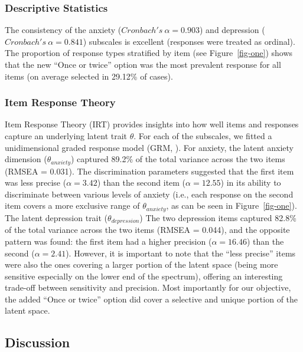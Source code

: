 \documentclass[
  jou,
  longtable,
  nolmodern,
  notxfonts,
  notimes,
  mask,
  colorlinks=true,linkcolor=blue,citecolor=blue,urlcolor=blue]{apa7}
\begin{document}
\subsubsection{Descriptive Statistics}\label{descriptive-statistics}

The consistency of the anxiety (\(Cronbach's~\alpha = 0.903\)) and
depression (\(Cronbach's~\alpha = 0.841\)) subscales is excellent
(responses were treated as ordinal). The proportion of response types
stratified by item (see Figure~\ref{fig-one}) shows that the new ``Once
or twice'' option was the most prevalent response for all items (on
average selected in 29.12\% of cases).

\subsubsection{Item Response Theory}\label{item-response-theory}

Item Response Theory (IRT) provides insights into how well items and
responses capture an underlying latent trait \(\theta\). For each of the
subscales, we fitted a unidimensional graded response model (GRM,
). For anxiety, the
latent anxiety dimension (\(\theta_{anxiety}\)) captured 89.2\% of the
total variance across the two items (RMSEA = 0.031). The discrimination
parameters suggested that the first item was less precise
(\(\alpha = 3.42\)) than the second item (\(\alpha = 12.55\)) in its
ability to discriminate between various levels of anxiety (i.e., each
response on the second item covers a more exclusive range of
\(\theta_{anxiety}\), as can be seen in Figure~\ref{fig-one}). The
latent depression trait (\(\theta_{depression}\)) The two depression
items captured 82.8\% of the total variance across the two items (RMSEA
= 0.044), and the opposite pattern was found: the first item had a
higher precision (\(\alpha = 16.46\)) than the second
(\(\alpha = 2.41\)). However, it is important to note that the ``less
precise'' items were also the ones covering a larger portion of the
latent space (being more sensitive especially on the lower end of the
spectrum), offering an interesting trade-off between sensitivity and
precision. Most importantly for our objective, the added ``Once or
twice'' option did cover a selective and unique portion of the latent
space.

\subsection{Discussion}\label{discussion}
\end{document}
